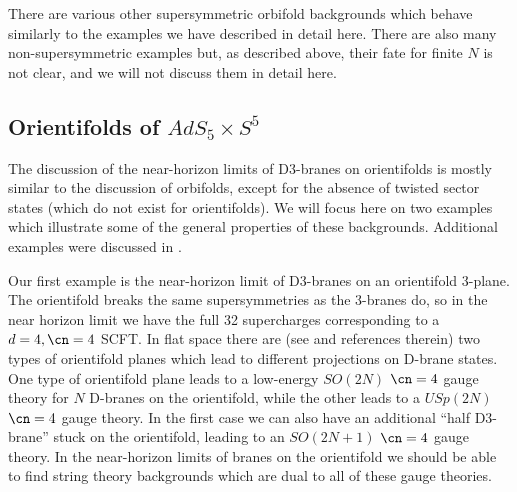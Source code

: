 There are various other supersymmetric orbifold backgrounds which
behave similarly to the examples we have described in detail
here. There are also many non-supersymmetric examples 
\cite{Frampton:1998en,Frampton:1999ti} but, as
described above, their fate for finite $N$ is not clear, and we will
not discuss them in detail here.

\subsection{Orientifolds of $AdS_5\times S^5$}
\label{orientifolds}

The discussion of the near-horizon limits of D3-branes on orientifolds
is mostly similar to the discussion of orbifolds, except for the
absence of twisted sector states (which do not exist for
orientifolds). We will focus here on two examples which illustrate
some of the general properties of these backgrounds. Additional
examples were discussed in \cite{Kakushadze:1998tr,Kakushadze:1998tz,
Kakushadze:1999hb,Kakushadze:1998yq,
Ahn:1998tv,
Park:1998zh,Gukov:1998kt,Gremm:1999jj}.

Our first example is the near-horizon limit of D3-branes on an
orientifold 3-plane. The orientifold breaks the same supersymmetries
as the 3-branes do, so in the near horizon limit we have the full 32
supercharges corresponding to a $d=4, \cn=4$ SCFT. In flat space there
are (see \cite{Giveon:1998sr} and references therein) two types of
orientifold planes which lead to different projections on D-brane
states. One type of orientifold plane leads to a low-energy $SO(2N)$
$\cn=4$ gauge theory for $N$ D-branes on the orientifold, while the
other leads to a $USp(2N)$ $\cn=4$ gauge theory. In the first case we
can also have an additional ``half D3-brane'' stuck on the
orientifold, leading to an $SO(2N+1)$ $\cn=4$ gauge theory. In the
near-horizon limits of branes on the orientifold we should be able to
find string theory backgrounds which are dual to all of these gauge
theories.

